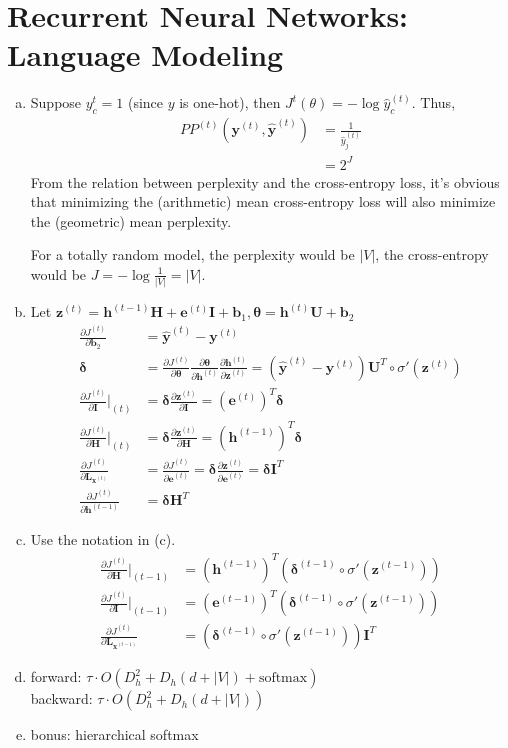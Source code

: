 \documentclass[11pt]{article}
\newcommand{\pder}[2][]{\frac{\partial#1}{\partial#2}}
\newcommand{\Jt}{J^{(t)}}
\newcommand{\pderJt}[1]{\pder[\Jt]{#1}}
\newcommand{\bh}{\bm{h}}
\newcommand{\bH}{\bm{H}}
\newcommand{\bL}{\bm{L}}
\newcommand{\be}{\bm{e}}
\newcommand{\bb}{\bm{b}}
\newcommand{\bU}{\bm{U}}
\newcommand{\bI}{\bm{I}}
\newcommand{\by}{\bm{y}}
\newcommand{\bx}{\bm{x}}
\newcommand{\bz}{\bm{z}}
\newcommand{\byhat}{\hat{\by}}
\newcommand{\btheta}{\bm{\theta}}
\newcommand{\bdelta}{\bm{\delta}}
\newcommand{\bht}[1][t]{\bh^{(#1)}}
\newcommand{\byt}[1][t]{\by^{(#1)}}
\newcommand{\byhatt}[1][t]{\byhat^{(#1)}}
\newcommand{\bet}[1][t]{\be^{(#1)}}
\newcommand{\bxt}[1][t]{\bx^{(#1)}}
\newcommand{\bzt}[1][t]{\bz^{(#1)}}
\newcommand{\bdeltat}[1][t-1]{\bdelta^{(#1)}}
\begin{document}
\section{Recurrent Neural Networks: Language Modeling}
\label{sec:3}

\begin{enumerate}[(a)]
\item Suppose $y_c^{t} = 1$ (since $y$ is one-hot), then $J^t(\theta) = - \log
  \hat{y}_c^{(t)}$.
  Thus,
  \begin{align*}
    PP^{(t)}(\bm{y}^{(t)}, \hat{\bm{y}}^{(t)}) &= \frac{1}{\hat{y}_j^{(t)}} \\
    &= 2^J
  \end{align*}
    From the relation between perplexity and the cross-entropy loss, it's
    obvious that minimizing the (arithmetic) mean cross-entropy loss will also
    minimize the (geometric) mean perplexity.

    For a totally random model, the perplexity would be $|V|$, the cross-entropy
    would be $J = - \log \frac{1}{|V|} = |V|$.
    
  \item Let $\bzt = \bht[t-1]\bH + \bet\bI + \bb_1, \btheta = \bht\bU + \bb_2$
    \begin{align*}
      \pder[J^{(t)}]{\bm{b}_2} &= \hat{\bm{y}}^{(t)} - \bm{y}^{(t)} \\
      \bdelta &= \pderJt{\btheta}\pder[\btheta]{\bht}\pder[\bht]{\bzt}= (\byhatt - \byt)\bU^T\circ \sigma'(\bzt) \\
      \pderJt{\bI}\Bigr|_{(t)} &= \bdelta \pder[\bzt]{\bI} = (\bet)^T\bdelta \\
      \pderJt{\bH}\Bigr|_{(t)} &= \bdelta \pder[\bzt]{\bH} = (\bht[t-1])^T\bdelta \\
      \pderJt{\bL_{\bxt}} &= \pderJt{\bet} = \bdelta \pder[\bzt]{\bet} = \bdelta\bI^T \\
      \pderJt{\bht[t-1]} &= \bdelta \bH^T
    \end{align*}
  \item Use the notation in (c).
    \begin{align*}
      \pderJt{\bH}\Bigr|_{(t-1)} &= (\bht[t-1])^T(\bdeltat\circ \sigma'(\bzt[t-1])) \\
      \pderJt{\bI}\Bigr|_{(t-1)} &= (\bet[t-1])^T(\bdeltat\circ \sigma'(\bzt[t-1])) \\
      \pderJt{\bL_{\bxt[t-1]}} &= (\bdeltat\circ \sigma'(\bzt[t-1]))\bI^T 
    \end{align*}
  \item forward: $\tau \cdot O(D_h^2 + D_h(d + |V|) + \text{softmax})$ \\
        backward: $\tau \cdot O(D_h^2 + D_h(d + |V|))$
  \item bonus: hierarchical softmax
    
\end{enumerate}
\end{document}
